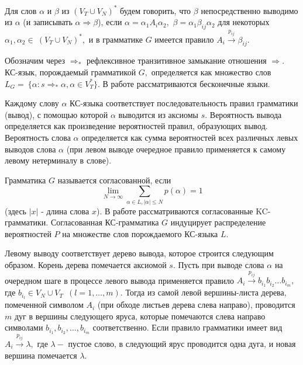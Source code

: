 \documentclass[%
11pt,a4paper]{article}
\begin{document}
{%
				
				

Для слов $\alpha $ и $\beta$
из $(V_T\cup V_N)^{*}$ будем говорить, что $\beta$
непосредственно выводимо из $\alpha$ (и записывать $\alpha \Rightarrow \beta $), если
$\alpha=\alpha_1 A_i \alpha_2,$ $\beta =\alpha_1 \beta_{ij}\alpha_2$
для некоторых $\alpha_1,\alpha_2 \in ~(V_T\cup V_N)^{*},$
и в грамматике $G$ имеется правило $A_i\stackrel{p_{ij}}{\rightarrow }\beta
_{ij}.$

Обозначим через $\Rightarrow_{*}$ рефлексивное транзитивное замыкание
отношения $\Rightarrow$.
КС-язык, порождаемый грамматикой $G,$ определяется как множество слов $L_G=~\{
\alpha : s \Rightarrow_{*} \alpha, \alpha \in V_T^* \}.$ В работе рассматриваются бесконечные языки.

Каждому слову $\alpha$ КС-языка соответствует последовательность правил
грамматики (вывод), с помощью которой $\alpha$ выводится из аксиомы $s.$
Вероятность вывода определяется как произведение вероятностей правил,
образующих вывод. Вероятность слова $\alpha$ определяется как
сумма вероятностей всех различных левых выводов слова $\alpha$
(при левом выводе очередное правило применяется к самому левому нетерминалу
в слове).

Грамматика $G$ называется согласованной, если
$$
\lim _{N\rightarrow \infty }\sum_{\alpha \in L, |\alpha |\le N}
p(\alpha)=1
$$
(здесь $|x|$ - длина слова $x$).
В работе рассматриваются согласованные KC-грамматики.
Согласованная КС-грам\-ма\-ти\-ка $G$ индуцирует распределение вероятностей
$P$ на множестве слов порождаемого КС-языка $L.$ 


Левому выводу соответствует дерево вывода, которое строится следующим образом.
Корень дерева помечается аксиомой $s.$ Пусть при выводе слова
$\alpha$ на очередном шаге в процессе левого вывода применяется
правило $A_i \stackrel{p_{ij}}{\rightarrow } b_{i_1} b_{i_2}\ldots
b_{i_m},$ где $b_{i_l} \in {V_N \cup V_T}$ $\,(l=1,\ldots,m).$
Тогда из самой левой вершины-листа дерева, помеченной символом
$A_i$ (при обходе листьев дерева слева направо), проводится $m$
дуг в вершины следующего яруса, которые помечаются слева направо
символами $b_{i_1}, b_{i_2},\ldots, b_{i_m}$ соответственно. Если правило грамматики имеет вид $A_i \stackrel{p_{ij}}{\rightarrow } \lambda,$ где $\lambda - $ пустое слово, в следующий ярус проводится одна дуга, и новая вершина помечается $\lambda.$
  
}
\end{document}
